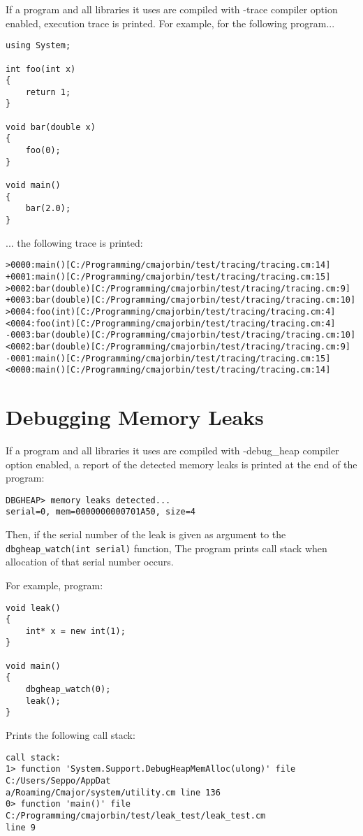 \documentclass[oneside, a4paper, 11pt]{article}
\begin{document}
If a program and all libraries it uses are compiled with -trace compiler option enabled,
execution trace is printed. For example, for the following program...

\begin{verbatim}
using System;

int foo(int x)
{
    return 1;
}

void bar(double x)
{
    foo(0);
}

void main()
{
    bar(2.0);
}
\end{verbatim}

... the following trace is printed:

\begin{verbatim}
>0000:main()[C:/Programming/cmajorbin/test/tracing/tracing.cm:14]
+0001:main()[C:/Programming/cmajorbin/test/tracing/tracing.cm:15]
>0002:bar(double)[C:/Programming/cmajorbin/test/tracing/tracing.cm:9]
+0003:bar(double)[C:/Programming/cmajorbin/test/tracing/tracing.cm:10]
>0004:foo(int)[C:/Programming/cmajorbin/test/tracing/tracing.cm:4]
<0004:foo(int)[C:/Programming/cmajorbin/test/tracing/tracing.cm:4]
-0003:bar(double)[C:/Programming/cmajorbin/test/tracing/tracing.cm:10]
<0002:bar(double)[C:/Programming/cmajorbin/test/tracing/tracing.cm:9]
-0001:main()[C:/Programming/cmajorbin/test/tracing/tracing.cm:15]
<0000:main()[C:/Programming/cmajorbin/test/tracing/tracing.cm:14]
\end{verbatim}

\section{Debugging Memory Leaks}

If a program and all libraries it uses are compiled with -debug\_heap compiler option enabled,
a report of the detected memory leaks is printed at the end of the program:

\begin{verbatim}
DBGHEAP> memory leaks detected...
serial=0, mem=0000000000701A50, size=4
\end{verbatim}

Then, if the serial number of the leak is given as argument to the \verb|dbgheap_watch(int serial)| function,
The program prints call stack when allocation of that serial number occurs.

For example, program:

\begin{verbatim}
void leak()
{
    int* x = new int(1);
}

void main()
{
    dbgheap_watch(0);
    leak();
}
\end{verbatim}

Prints the following call stack:

\begin{verbatim}
call stack:
1> function 'System.Support.DebugHeapMemAlloc(ulong)' file C:/Users/Seppo/AppDat
a/Roaming/Cmajor/system/utility.cm line 136
0> function 'main()' file C:/Programming/cmajorbin/test/leak_test/leak_test.cm
line 9
\end{verbatim}
\end{document}
